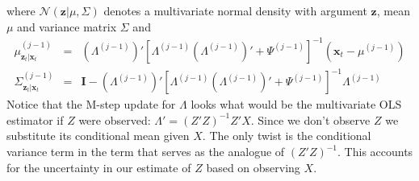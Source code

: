 where $\mathcal{N}(\mathbf{z}|\mu, \Sigma)$ denotes a multivariate normal density with argument $\mathbf{z}$, mean $\mu$ and variance matrix $\Sigma$ and
	\begin{eqnarray*}
		\mu^{(j-1)}_{\mathbf{z}_t|\mathbf{x}_t} &=& \left(\Lambda^{(j-1)}\right)' \left[\Lambda^{(j-1)} \left(\Lambda^{(j-1)}\right)' + \Psi^{(j-1)}\right]^{-1} \left(\mathbf{x}_t - \mu^{(j-1)}\right) \\
		\Sigma^{(j-1)}_{\mathbf{z}_t|\mathbf{x}_t}  &=& \mathbf{I} - \left(\Lambda^{(j-1)}\right)' \left[\Lambda^{(j-1)} \left(\Lambda^{(j-1)}\right)' + \Psi^{(j-1)}\right]^{-1}\Lambda^{(j-1)}
	\end{eqnarray*}
Notice that the M-step update for $\Lambda$ looks what would be the multivariate OLS estimator if $Z$ were observed: $\Lambda' = (Z'Z)^{-1}Z'X$. Since we don't observe $Z$ we substitute its conditional mean given $X$. The only twist is the conditional variance term in the term that serves as the analogue of $(Z'Z)^{-1}$. This accounts for the uncertainty in our estimate of $Z$ based on observing $X$.

